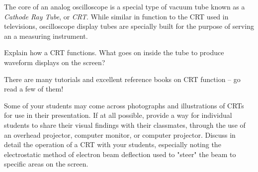 

The core of an analog oscilloscope is a special type of vacuum tube known as a {\it Cathode Ray Tube}, or {\it CRT}.  While similar in function to the CRT used in televisions, oscilloscope display tubes are specially built for the purpose of serving an a measuring instrument.

Explain how a CRT functions.  What goes on inside the tube to produce waveform displays on the screen?







There are many tutorials and excellent reference books on CRT function -- go read a few of them!  







Some of your students may come across photographs and illustrations of CRTs for use in their presentation.  If at all possible, provide a way for individual students to share their visual findings with their classmates, through the use of an overhead projector, computer monitor, or computer projector.  Discuss in detail the operation of a CRT with your students, especially noting the electrostatic method of electron beam deflection used to "steer" the beam to specific areas on the screen.




